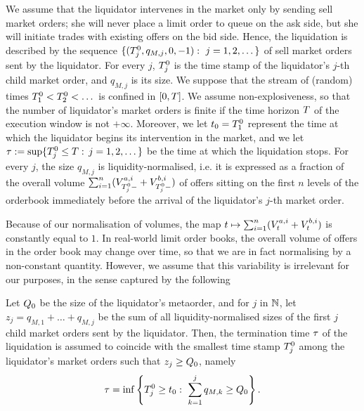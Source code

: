 \documentclass[10pt, article,table]{article}
\begin{document}
We assume that the liquidator intervenes in the market only by sending sell market orders; she will never place a limit order to queue on the ask side, but she will initiate trades with existing offers on the bid side. 
Hence, the liquidation is described by the sequence $\lbrace (\arrivalTimes[0]_j, q_{M,j},0,-1): \, \, j=1,2,\dots \rbrace$ of sell market orders sent by the liquidator. For every $j$, $\arrivalTimes[0]_j$ is the time stamp of the liquidator's $j$-th child market order, and $q_{M,j}$ is its size. 
We suppose that the stream of (random) times $\arrivalTimes[0]_1 < \arrivalTimes[0]_2 < \dots$ is confined in $\timeWindow$. We assume non-explosiveness, so that the number of liquidator's market orders is finite if the time horizon $\timeHorizon$ of the execution window is not $+\infty$. Moreover, we let $\initialTime = \arrivalTimes[0]_1$ represent the time at which the liquidator begins its intervention in the market, and we let $\terminationTime:=\sup\lbrace\arrivalTimes[0]_j\leq\timeHorizon: \, j=1,2,\dots\rbrace$ be the time at which the liquidation stops. 
For every $j$, the size $q_{M,j}$ is liquidity-normalised, i.e. it is expressed as a fraction of the overall volume $\sum_{i=1}^{n}(\nthBestAskVolume[i]_{\arrivalTimes[0]_j-} + \nthBestBidVolume[i]_{\arrivalTimes[0]_j-})$ of offers sitting on the first $n$ levels of the orderbook immediately before the arrival of the liquidator's $j$-th market order.

Because of our normalisation of volumes, the map  $t\mapsto \sum_{i=1}^{n}(\nthBestAskVolume[i]_t +\nthBestBidVolume[i]_t)$ is constantly equal to $1$. In real-world limit order books, the overall volume of offers in the order book may change over time, so that we are in fact normalising by a non-constant quantity. However, we assume that this variability is irrelevant for our purposes, in the sense captured by the following 
\begin{assumption}\label{assumption.termination-time_of_liquidation}
Let $\metaorderSize$ be the size of the liquidator's metaorder, and for $j$ in $\N$,  let $z_j = q_{M,1}+\dots+q_{M,j}$ be the sum of all liquidity-normalised sizes of the first $j$ child market orders sent by the liquidator. Then, the termination time $\terminationTime$ of the liquidation is assumed to coincide with the smallest time stamp $\arrivalTimes[0]_j$ among the liquidator's market orders such that $z_j \geq \metaorderSize$, namely
 \begin{equation*}
\terminationTime = \inf\left\lbrace \arrivalTimes[0]_j \geq \initialTime : \, \, 
 \sum_{k=1}^{j} q_{M,k} \geq \metaorderSize \right\rbrace.
 \end{equation*}
\end{assumption}
\end{document}
